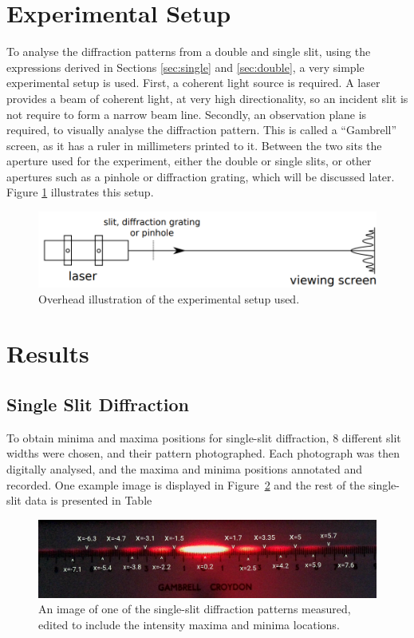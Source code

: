 \documentclass[a4paper]{article}
\begin{document}
\section{Experimental Setup}

To analyse the diffraction patterns from a double and single slit, using the expressions derived in Sections \ref{sec:single} and \ref{sec:double}, a very simple experimental setup is used. First, a coherent light source is required. A laser provides a beam of coherent light, at very high directionality, so an incident slit is not require to form a narrow beam line. Secondly, an observation plane is required, to visually analyse the diffraction pattern. This is called a ``Gambrell'' screen, as it has a ruler in millimeters printed to it. Between the two sits the aperture used for the experiment, either the double or single slits, or other apertures such as a pinhole or diffraction grating, which will be discussed later. Figure \ref{fig:setup} illustrates this setup.

\begin{figure}[h]
  \centerline{\includegraphics[scale=0.3]{setup.png}}
  \captionsetup{justification=centering}
  \caption{Overhead illustration of the experimental setup used.}
  \label{fig:setup}
\end{figure}

\section{Results}

\subsection{Single Slit Diffraction}

To obtain minima and maxima positions for single-slit diffraction, 8 different slit widths were chosen, and their pattern photographed. Each photograph was then digitally analysed, and the maxima and minima positions annotated and recorded. One example image is displayed in Figure~\ref{fig:ss_measurement} and the rest of the single-slit data is presented in Table 

\begin{figure}[h]
  \centerline{\includegraphics[scale=0.7]{q2sa3.png}}
  \captionsetup{justification=centering}
  \caption{An image of one of the single-slit diffraction patterns measured, edited to include the intensity maxima and minima locations.}
  \label{fig:ss_measurement}
\end{figure}
\end{document}
